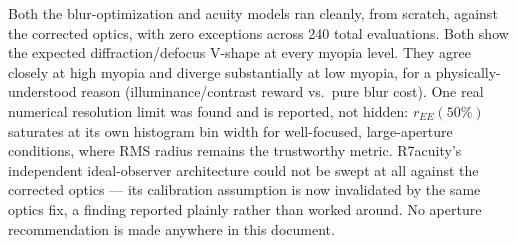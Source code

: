 \documentclass[10.5pt]{report}
\begin{document}
Both the blur-optimization and acuity models ran cleanly, from scratch, against the
corrected optics, with zero exceptions across 240 total evaluations. Both show the
expected diffraction/defocus V-shape at every myopia level. They agree closely at
high myopia and diverge substantially at low myopia, for a physically-understood
reason (illuminance/contrast reward vs.\ pure blur cost). One real numerical
resolution limit was found and is reported, not hidden: $r_{EE}(50\%)$ saturates at
its own histogram bin width for well-focused, large-aperture conditions, where RMS
radius remains the trustworthy metric. R7acuity's independent ideal-observer
architecture could not be swept at all against the corrected optics --- its
calibration assumption is now invalidated by the same optics fix, a finding reported
plainly rather than worked around. No aperture recommendation is made anywhere in
this document.
\end{document}
